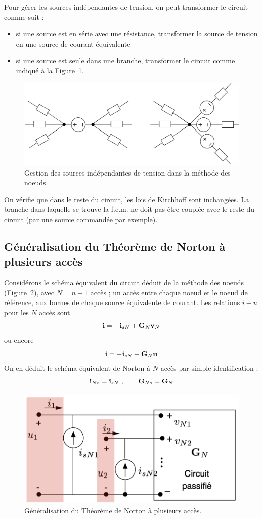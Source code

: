 Pour gérer les sources indépendantes de tension, on peut transformer le circuit comme suit : 
\begin{itemize}
	\item si une source est en série avec une résistance,  transformer la source de tension en une source de courant équivalente
	\item si une source est seule dans une branche, transformer le circuit comme indiqué à la Figure~\ref{fig:transformation_SIV}.
\end{itemize}
\begin{figure}[htb]
\centering
\includegraphics[width=0.95\linewidth]{figs/methodes-generales/transformation_SIV}
\caption{Gestion des sources indépendantes de tension dans la méthode des noeuds.}
\label{fig:transformation_SIV}
\end{figure}

On vérifie que dans le reste du circuit, les lois de Kirchhoff sont inchangées. La branche dans laquelle se trouve la f.e.m. ne doit pas être couplée avec le reste du circuit (par une source commandée par exemple).

\subsection{Généralisation du Théorème de Norton à plusieurs accès}
Considérons le schéma équivalent du circuit déduit de la méthode des noeuds (Figure~\ref{fig:nortonMM}), avec $N=n-1$ accès ; un accès entre chaque noeud et le noeud de référence, aux bornes de chaque source équivalente de courant.
Les relations $i-u$ pour les $N$ accès sont
\[{\bf i}=-{\bf i}_{sN}+{\bf G}_N{\bf v}_N\]
ou encore
\[{\bf i}=-{\bf i}_{sN}+{\bf G}_N{\bf u}\]
On en déduit le schéma équivalent de Norton à $N$ accès par simple identification :
\[ {\bf i}_{No} = {\bf i}_{sN}\,\, , \quad \quad {\bf G}_{No}={\bf G}_{N}\]
\begin{figure}[htb]
\centering
\includegraphics[width=0.7\linewidth]{figs/methodes-generales/norton}
\caption{Généralisation du Théorème de Norton à plusieurs accès.}
\label{fig:nortonMM}
\end{figure}

